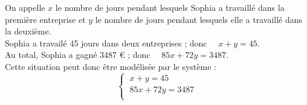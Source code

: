 \documentclass[a4paper,11pt,exos]{nsi}
\begin{document}
On appelle $x$ le nombre de jours pendant lesquels Sophia a travaillé dans la première entreprise et $y$ le nombre de jours pendant lesquels elle a travaillé dans la deuxième.\\[.5em]
Sophia a travailé 45 jours dans deux entreprises ; donc $\quad x+y=45$.\\[.5em]
Au total, Sophia a gagné 3487 € ; donc $\quad 85x+72y=3487$.\\[.5em]
Cette situation peut donc être modélisée par le système :
$$\left\{
			\begin{array}{l}
				\ x+y=45 \\
				\ 85x+72y=3487 \\
			\end{array} \right.$$



\exo{}
\end{document}
